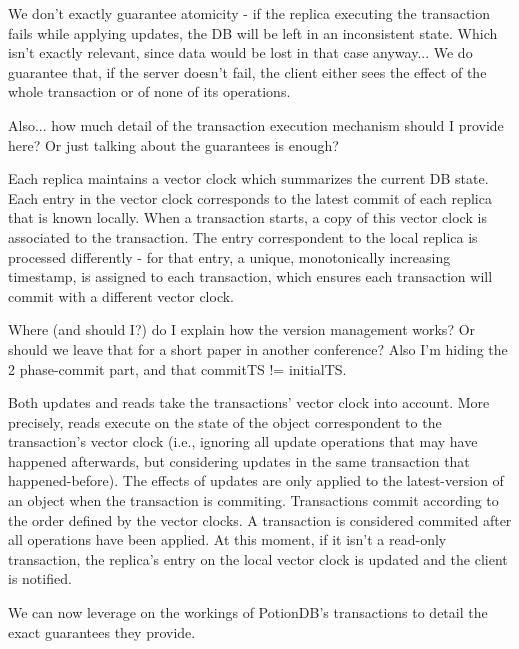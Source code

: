 \documentclass{vldb}
\newcommand{\grumbler}[2]{{\color{red}{\bf #1:} #2}}
\newcommand{\andre}[1]{\grumbler{andre}{#1}}
\begin{document}
\andre{We don't exactly guarantee atomicity - if the replica executing the transaction fails while applying updates, the DB will be left in an inconsistent state. Which isn't exactly relevant, since data would be lost in that case anyway... We do guarantee that, if the server doesn't fail, the client either sees the effect of the whole transaction or of none of its operations.}

\andre{Also... how much detail of the transaction execution mechanism should I provide here? Or just talking about the guarantees is enough?}

Each replica maintains a vector clock which summarizes the current DB state.
Each entry in the vector clock corresponds to the latest commit of each replica that is known locally.
When a transaction starts, a copy of this vector clock is associated to the transaction.
The entry correspondent to the local replica is processed differently - for that entry, a unique, monotonically increasing timestamp, is assigned to each transaction, which ensures each transaction will commit with a different vector clock.

\andre{Where (and should I?) do I explain how the version management works? Or should we leave that for a short paper in another conference? Also I'm hiding the 2 phase-commit part, and that commitTS != initialTS.}

Both updates and reads take the transactions' vector clock into account.
More precisely, reads execute on the state of the object correspondent to the transaction's vector clock (i.e., ignoring all update operations that may have happened afterwards, but considering updates in the same transaction that happened-before).
The effects of updates are only applied to the latest-version of an object when the transaction is commiting.
Transactions commit according to the order defined by the vector clocks.
A transaction is considered commited after all operations have been applied.
At this moment, if it isn't a read-only transaction, the replica's entry on the local vector clock is updated and the client is notified.

We can now leverage on the workings of PotionDB's transactions to detail the exact guarantees they provide.
\end{document}
